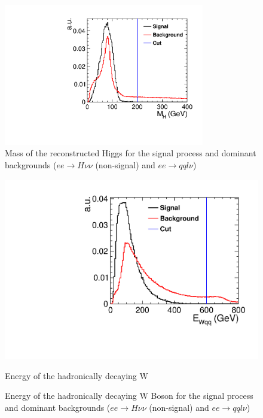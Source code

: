 \begin{figure}
  \centering
  \includegraphics[width=0.78\textwidth,keepaspectratio]{HiggsAnalysis/figures/PseudoHiggs_PreSelection}
  \caption[Reconstructed Higgs mass for signal and background events]{Mass of the reconstructed Higgs for the signal process and dominant backgrounds ($ee\rightarrow H\nu\nu$ (non-signal) and $ee\rightarrow qql\nu$)}
  \label{fig:HMassPreSel}
\end{figure}

\begin{figure}
  \centering
    \includegraphics[width=0.78\linewidth,keepaspectratio]{HiggsAnalysis/figures/EWqq_PreSelection}
    \caption{Energy of the hadronically decaying W}
    \caption[Energy of the hadronically decaying W Boson for signal and background events]{Energy of the hadronically decaying W Boson for the signal process and dominant backgrounds ($ee\rightarrow H\nu\nu$ (non-signal) and $ee\rightarrow qql\nu$)}
  \label{fig:WPreSel}
\end{figure}


